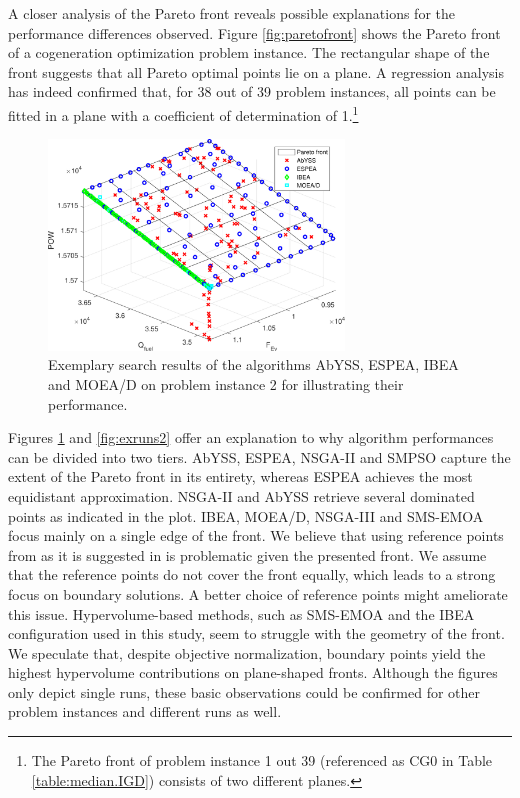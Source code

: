 A closer analysis of the Pareto front reveals possible explanations for the performance differences observed. Figure \ref{fig:paretofront} shows the Pareto front of a cogeneration optimization problem instance. The rectangular shape of the front suggests that all Pareto optimal points lie on a plane. A regression analysis has indeed confirmed that, for 38 out of 39 problem instances, all points can be fitted in a plane with a coefficient of determination of 1.\footnote{The Pareto front of problem instance 1 out 39 (referenced as CG0 in Table \ref{table:median.IGD}) consists of two different planes.} 

\begin{figure}
\centering
\includegraphics[width=0.7\textwidth]{figures/example1_cropped.pdf}
\caption{Exemplary search results of the algorithms AbYSS, ESPEA, IBEA and MOEA/D on problem instance 2 for illustrating their performance.}
\label{fig:exruns1}
\end{figure}

Figures \ref{fig:exruns1} and \ref{fig:exruns2} offer an explanation to why algorithm performances can be divided into two tiers. AbYSS, ESPEA, NSGA-II and SMPSO capture the extent of the Pareto front in its entirety, whereas ESPEA achieves the most equidistant approximation. NSGA-II and AbYSS retrieve several dominated points as indicated in the plot. IBEA, MOEA/D, NSGA-III and SMS-EMOA focus mainly on a single edge of the front. We believe that using reference points from \cite{nbi} as it is suggested in \cite{moead2009,nsga3part1} is problematic given the presented front. We assume that the reference points do not cover the front equally, which leads to a strong focus on boundary solutions. A better choice of reference points might ameliorate this issue. Hypervolume-based methods, such as SMS-EMOA and the IBEA configuration used in this study, seem to struggle with the geometry of the front. We speculate that, despite objective normalization, boundary points yield the highest hypervolume contributions on plane-shaped fronts. Although the figures only depict single runs, these basic observations could be confirmed for other problem instances and different runs as well.

